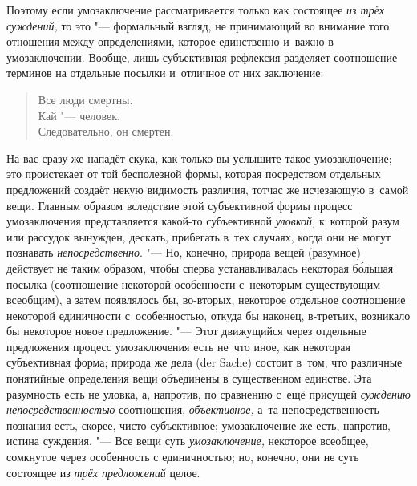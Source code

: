 Поэтому если умозаключение рассматривается только как
состоящее {\em из трёх суждений,}
то это "--- формальный взгляд, не принимающий во
внимание того отношения между определениями, которое единственно и~важно в
умозаключении. Вообще, лишь субъективная рефлексия разделяет соотношение
терминов на отдельные посылки и~отличное от них заключение:

\begin{verse}
Все люди смертны.\\
Кай "--- человек.\\
Следовательно, он смертен.
\end{verse}

На вас сразу же нападёт скука, как только вы услышите такое
умозаключение; это проистекает от той бесполезной формы, которая
посредством отдельных предложений создаёт некую видимость различия, тотчас
же исчезающую в~самой вещи. Главным образом вследствие этой субъективной
формы процесс умозаключения представляется какой-то субъективной
{\em уловкой,} к~которой разум или рассудок вынужден, дескать, прибегать
в~тех случаях, когда они не могут познавать {\em непосредственно}.
"--- Но, конечно, природа вещей (разумное) действует не таким
образом, чтобы сперва устанавливалась некоторая б\'{о}льшая посылка
(соотношение некоторой особенности с~некоторым существующим всеобщим), а
затем появлялось бы, во-вторых, некоторое отдельное соотношение некоторой
единичности с~особенностью, откуда бы наконец, в-третьих, возникало бы
некоторое новое предложение. "--- \label{bkm:bm52a}Этот
движущийся через отдельные предложения процесс умозаключения есть
не~что иное, как некоторая субъективная форма; природа же дела (der Sache)
состоит в~том, что различные понятийные определения вещи объединены в
существенном единстве. Эта разумность есть не уловка, а, напротив, по сравнению
с~ещё присущей {\em суждению непосредственностью} соотношения, {\em
объективное,} а~та непосредственность познания есть, скорее, чисто
субъективное; умозаключение же есть, напротив, истина суждения. "--- Все вещи
суть {\em умозаключение,} некоторое всеобщее, сомкнутое через особенность с
единичностью; но, конечно, они не суть состоящее из {\em трёх предложений}
целое.

